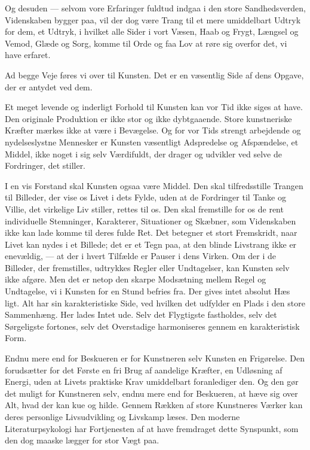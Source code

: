 \documentclass[12pt,a4paper,openany]{book}
\newcommand{\opage}[1]{\marginnote{\footnotesize\textit{[#1]}}}
\begin{document}
Og desuden --- selvom vore Erfaringer fuldtud indgaa i
den store Sandhedsverden, Videnskaben bygger paa, vil der
dog være Trang til et mere umiddelbart Udtryk for dem, et
Udtryk, i hvilket alle Sider i vort Væsen, Haab og Frygt,
Længsel og Vemod, Glæde og Sorg, komme til Orde og faa
Lov at røre sig overfor det, vi have erfaret.

Ad begge Veje føres vi over til Kunsten. Det er en væsentlig
Side af dens Opgave, der er antydet ved dem.

Et meget levende og inderligt Forhold til Kunsten kan vor
Tid ikke siges at have. Den originale Produktion er ikke stor
og ikke dybtgaaende. Store kunstneriske Kræfter mærkes ikke
at være i Bevægelse. Og for vor Tids strengt arbejdende og
nydelseslystne Mennesker er Kunsten væsentligt Adspredelse
og Afspændelse, et Middel, ikke noget i sig selv Værdifuldt,
der drager og udvikler ved selve de Fordringer, det stiller.

I en vis Forstand skal Kunsten ogsaa være Middel. Den
skal tilfredsstille Trangen til Billeder, der vise os Livet i dets
Fylde, uden at de Fordringer til Tanke og Villie, det virkelige
Liv stiller, rettes til os. Den skal fremstille for os de rent
individuelle Stemninger, Karakterer, Situationer og Skæbner,
som Videnskaben ikke kan lade komme til deres fulde Ret.
Det betegner et stort Fremskridt, naar Livet kan nydes i et
Billede; det er et Tegn paa, at den blinde Livstrang ikke er
enevældig, --- at der i hvert Tilfælde er Pauser i dens Virken.
Om der i de Billeder, der fremstilles, udtrykkes Regler eller
Undtagelser, kan Kunsten selv ikke afgøre. Men det er netop
den skarpe Modsætning mellem Regel og Undtagelse, vi i
Kunsten for en Stund befries fra. Der gives intet absolut Hæs%
\setcounter{footnote}{0}%
\opage{9}ligt. Alt har sin karakteristiske Side, ved hvilken det udfylder
en Plads i den store Sammenhæng. Her lades Intet ude. Selv
det Flygtigste fastholdes, selv det Sørgeligste fortones, selv
det Overstadige harmoniseres gennem en karakteristisk Form.

Endnu mere end for Beskueren er for Kunstneren selv
Kunsten en Frigørelse. Den forudsætter for det Første en fri
Brug af aandelige Kræfter, en Udløsning af Energi, uden at
Livets praktiske Krav umiddelbart foranlediger den. Og den
gør det muligt for Kunstneren selv, endnu mere end for Beskueren,
at hæve sig over Alt, hvad der kan kue og hilde.
Gennem Rækken af store Kunstneres Værker kan deres personlige
Livsudvikling og Livskamp læses. Den moderne Literaturpsykologi
har Fortjenesten af at have fremdraget dette
Synspunkt, som den dog maaske lægger for stor Vægt paa.
\end{document}
